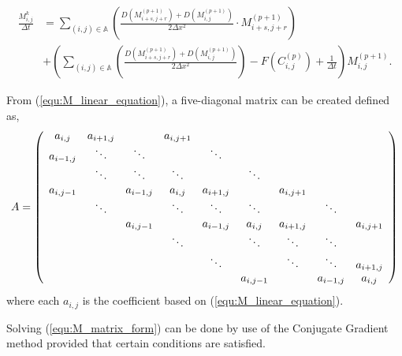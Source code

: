 \begin{equation} \label{equ:M_linear_equation}
\begin{aligned}
  \frac{M^{k}_{i,j}}{\Delta t} &= 
  \sum_{(i,j) \in \mathbb{A}} \left( \frac{D(M^{(p+1)}_{i+s,j+r}) + D(M^{(p+1)}_{i,j})} 
    {2\Delta x^2} \cdot M^{(p+1)}_{i+s, j+r} \right) \\
  & +\left( \sum_{(i,j) \in \mathbb{A}} \left( \frac{ D(M^{(p+1)}_{i+s,j+r}) + D(M^{(p+1)}_{i,j})} 
    {2\Delta x^2} \right) - F(C^{(p)}_{i,j}) + \frac{1}{\Delta t} \right) M^{(p+1)}_{i,j}.
\end{aligned}
\end{equation} 

From (\ref{equ:M_linear_equation}), a five-diagonal matrix can be created defined as,
\begin{equation} \label{equ:M_matrix_form}
  A = 
    \left( 
      \begin{array}{c c c c c c c c c c}
        a_{i,j} & a_{i+1,j} &  & a_{i,j+1} &   \\
        a_{i-1,j} & \ddots & \ddots &   &  \ddots &   \\
        & \ddots & \ddots & \ddots & & \ddots & \\
        a_{i,j-1} &  & a_{i-1,j} & a_{i,j} & a_{i+1,j} &   &  a_{i,j+1} &   \\
        & \ddots & & \ddots & \ddots & \ddots & & \ddots\\
        & & a_{i,j-1} &  & a_{i-1,j} & a_{i,j} & a_{i+1,j} &  & a_{i,j+1} \\
        & & & \ddots & & \ddots & \ddots & \ddots & \\
        & & & & \ddots & & \ddots & \ddots & a_{i+1,j} \\
        & & & & & a_{i,j-1} & & a_{i-1,j} & a_{i,j}
      \end{array}
    \right)
\end{equation}
where each $a_{i,j}$ is the coefficient based on (\ref{equ:M_linear_equation}). 

Solving (\ref{equ:M_matrix_form}) can be done by use of the Conjugate Gradient method provided that certain conditions are satisfied.

